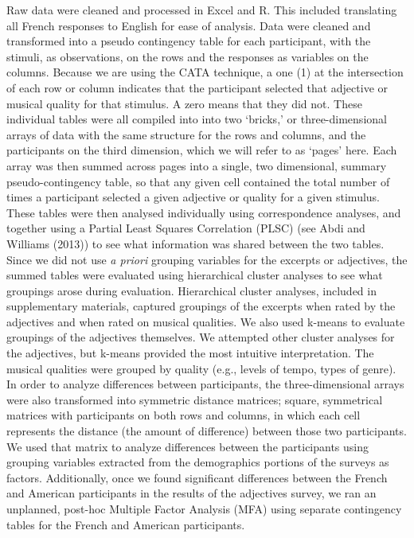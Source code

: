 \documentclass[
  english,
  man,floatsintext]{apa6}
\begin{document}
Raw data were cleaned and processed in Excel and R. This included translating all French responses to English for ease of analysis. Data were cleaned and transformed into a pseudo contingency table for each participant, with the stimuli, as observations, on the rows and the responses as variables on the columns. Because we are using the CATA technique, a one (1) at the intersection of each row or column indicates that the participant selected that adjective or musical quality for that stimulus. A zero means that they did not. These individual tables were all compiled into into two `bricks,' or three-dimensional arrays of data with the same structure for the rows and columns, and the participants on the third dimension, which we will refer to as `pages' here. Each array was then summed across pages into a single, two dimensional, summary pseudo-contingency table, so that any given cell contained the total number of times a participant selected a given adjective or quality for a given stimulus. These tables were then analysed individually using correspondence analyses, and together using a Partial Least Squares Correlation (PLSC) (see Abdi and Williams (2013)) to see what information was shared between the two tables.
Since we did not use \emph{a priori} grouping variables for the excerpts or adjectives, the summed tables were evaluated using hierarchical cluster analyses to see what groupings arose during evaluation. Hierarchical cluster analyses, included in supplementary materials, captured groupings of the excerpts when rated by the adjectives and when rated on musical qualities. We also used k-means to evaluate groupings of the adjectives themselves. We attempted other cluster analyses for the adjectives, but k-means provided the most intuitive interpretation. The musical qualities were grouped by quality (e.g., levels of tempo, types of genre).
In order to analyze differences between participants, the three-dimensional arrays were also transformed into symmetric distance matrices; square, symmetrical matrices with participants on both rows and columns, in which each cell represents the distance (the amount of difference) between those two participants. We used that matrix to analyze differences between the participants using grouping variables extracted from the demographics portions of the surveys as factors. Additionally, once we found significant differences between the French and American participants in the results of the adjectives survey, we ran an unplanned, post-hoc Multiple Factor Analysis (MFA) using separate contingency tables for the French and American participants.
\end{document}
